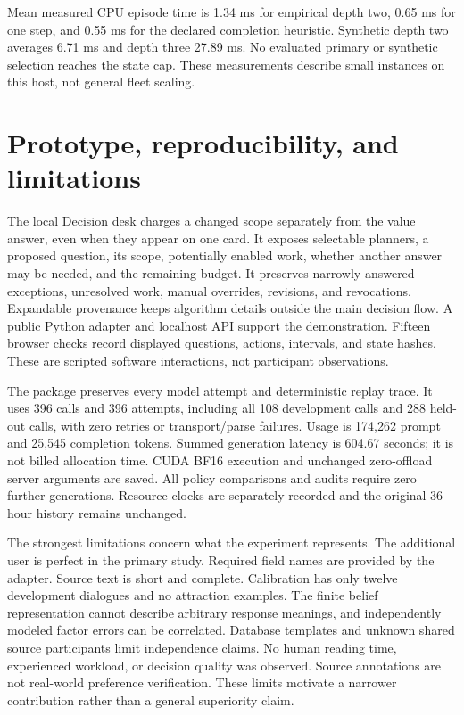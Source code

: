 \documentclass[11pt]{article}
\begin{document}
Mean measured CPU episode time is 1.34 ms for empirical depth two, 0.65 ms for one step, and 0.55 ms for the declared completion heuristic. Synthetic depth two averages 6.71 ms and depth three 27.89 ms. No evaluated primary or synthetic selection reaches the state cap. These measurements describe small instances on this host, not general fleet scaling.

\section{Prototype, reproducibility, and limitations}
The local Decision desk charges a changed scope separately from the value answer, even when they appear on one card. It exposes selectable planners, a proposed question, its scope, potentially enabled work, whether another answer may be needed, and the remaining budget. It preserves narrowly answered exceptions, unresolved work, manual overrides, revisions, and revocations. Expandable provenance keeps algorithm details outside the main decision flow. A public Python adapter and localhost API support the demonstration. Fifteen browser checks record displayed questions, actions, intervals, and state hashes. These are scripted software interactions, not participant observations.

The package preserves every model attempt and deterministic replay trace. It uses 396 calls and 396 attempts, including all 108 development calls and 288 held-out calls, with zero retries or transport/parse failures. Usage is 174,262 prompt and 25,545 completion tokens. Summed generation latency is 604.67 seconds; it is not billed allocation time. CUDA BF16 execution and unchanged zero-offload server arguments are saved. All policy comparisons and audits require zero further generations. Resource clocks are separately recorded and the original 36-hour history remains unchanged.

The strongest limitations concern what the experiment represents. The additional user is perfect in the primary study. Required field names are provided by the adapter. Source text is short and complete. Calibration has only twelve development dialogues and no attraction examples. The finite belief representation cannot describe arbitrary response meanings, and independently modeled factor errors can be correlated. Database templates and unknown shared source participants limit independence claims. No human reading time, experienced workload, or decision quality was observed. Source annotations are not real-world preference verification. These limits motivate a narrower contribution rather than a general superiority claim.
\end{document}
